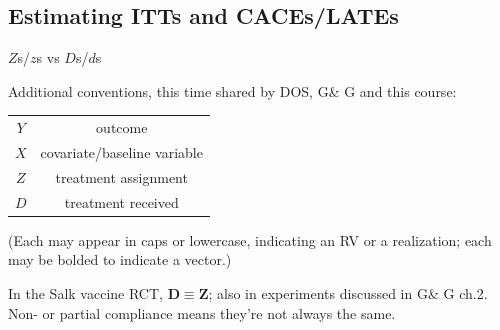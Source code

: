


\subsection{Estimating ITTs and CACEs/LATEs}

\begin{frame}{$Z$s/$z$s vs $D$s/$d$s}
  
Additional conventions, this time shared by DOS, G\& G and this course:

\begin{tabular}{cc}
  $Y$ & outcome \\
  $X$ & covariate/baseline variable\\
  $Z$ & treatment assignment\\
  $D$ & treatment received \\
\end{tabular}
\pause

(Each may appear in caps or lowercase, indicating an RV or a realization; each may be bolded to indicate a vector.) \pause

In the Salk vaccine RCT, $\mathbf{D} \equiv \mathbf{Z}$; also in
experiments discussed in G\& G ch.2.  Non- or partial compliance means
they're not always the same. 

\end{frame}


